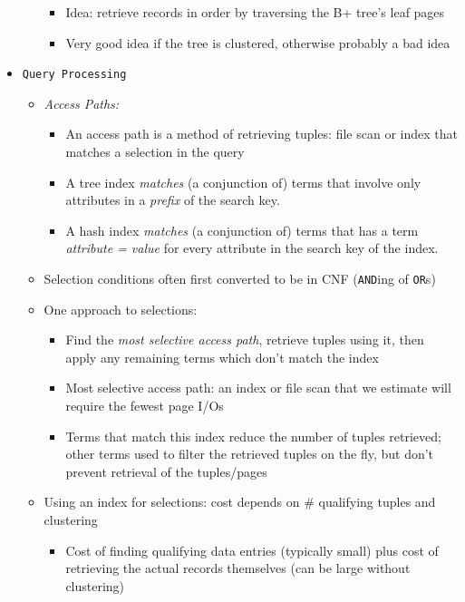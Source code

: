 \documentclass[landscape,8pt]{extarticle}
\newcommand{\code}{\lstinline}
\begin{document}
\begin{multicols}{4}
\begin{itemize}
\begin{itemize}
\begin{itemize}
                \item Idea: retrieve records in order by traversing the B+ tree's leaf pages
                \item Very good idea if the tree is clustered, otherwise probably a bad idea
            \end{itemize}
        \end{itemize}
        \item \code{Query Processing}
        \begin{itemize}
            \item \emph{Access Paths:}
            \begin{itemize}
                \item An access path is a method of retrieving tuples: file scan or index that matches a selection in the query
                \item A tree index \emph{matches} (a conjunction of) terms that involve only attributes in a \emph{prefix} of the search key.
                \item A hash index \emph{matches} (a conjunction of) terms that has a term \emph{attribute = value} for every attribute in the search key of the index.
            \end{itemize}
            \item Selection conditions often first converted to be in CNF (\code{AND}ing of \code{OR}s)
            \item One approach to selections:
            \begin{itemize}
                \item Find the \emph{most selective access path}, retrieve tuples using it, then apply any remaining terms which don't match the index
                \item Most selective access path: an index or file scan that we estimate will require the fewest page I/Os
                \item Terms that match this index reduce the number of tuples retrieved; other terms used to filter the retrieved tuples on the fly, but don't prevent retrieval of the tuples/pages
            \end{itemize}
            \item Using an index for selections: cost depends on \# qualifying tuples and clustering
            \begin{itemize}
                \item Cost of finding qualifying data entries (typically small) plus cost of retrieving the actual records themselves (can be large without clustering)

\end{itemize}
\end{itemize}
\end{itemize}
\end{multicols}
\end{document}

